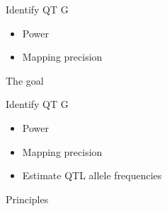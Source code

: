 \documentclass[12pt]{article}
\newcommand{\headsize}{\fontsize{35}{35} \selectfont}
\newcommand{\smallsize}{\fontsize{25}{30} \selectfont}
\begin{document}
{\vspace{25mm}

\color{mywhite}
\smallsize

\hfill \begin{minipage}{9.5in}
Identify QT{\color{mypink} G}
\end{minipage}

\vspace{15mm}

\hfill \begin{minipage}{9in}
\color{myblue}
\begin{itemize}
\itemsep24pt
\item Power
\item Mapping precision
\end{itemize}
\end{minipage}




\newpage

\addtocounter{page}{-1}

\headsize \color{myyellow}
\hfill \begin{minipage}{5.75in}
\centering
The goal
\end{minipage}

\vspace{25mm}

\color{mywhite}
\smallsize

\hfill \begin{minipage}{9.5in}
Identify QT{\color{mypink} G}
\end{minipage}

\vspace{15mm}

\hfill \begin{minipage}{9in}
\color{myblue}
\begin{itemize}
\itemsep24pt
\item Power
\item Mapping precision
\item Estimate QTL allele frequencies
\end{itemize}
\end{minipage}



\newpage


\headsize \color{myyellow}
\hfill \begin{minipage}{5.75in}
\centering
Principles
\end{minipage}

}
\end{document}
